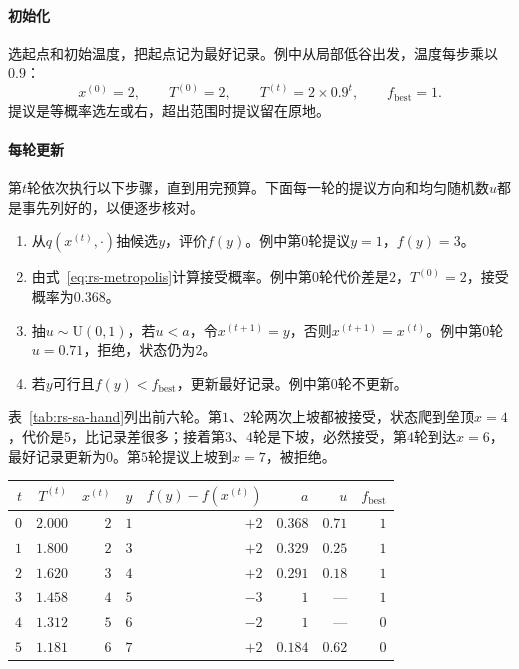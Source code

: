\paragraph{初始化}
选起点和初始温度，把起点记为最好记录。例中从局部低谷出发，温度每步乘以$0.9$：
\[
 x^{(0)}=2,\qquad T^{(0)}=2,\qquad T^{(t)}=2\times0.9^{t},\qquad f_{\mathrm{best}}=1.
\]
提议是等概率选左或右，超出范围时提议留在原地。

\paragraph{每轮更新}
第$t$轮依次执行以下步骤，直到用完预算。下面每一轮的提议方向和均匀随机数$u$都是事先列好的，以便逐步核对。

\begin{enumerate}
 \item 从$q(x^{(t)},\cdot)$抽候选$y$，评价$f(y)$。例中第$0$轮提议$y=1$，$f(y)=3$。
 \item 由式~\eqref{eq:rs-metropolis}计算接受概率。例中第$0$轮代价差是$2$，$T^{(0)}=2$，接受概率为$0.368$。
 \item 抽$u\sim\mathrm{U}(0,1)$，若$u<a$，令$x^{(t+1)}=y$，否则$x^{(t+1)}=x^{(t)}$。例中第$0$轮$u=0.71$，拒绝，状态仍为$2$。
 \item 若$y$可行且$f(y)<f_{\mathrm{best}}$，更新最好记录。例中第$0$轮不更新。
\end{enumerate}

表~\ref{tab:rs-sa-hand}列出前六轮。第$1$、$2$轮两次上坡都被接受，状态爬到垒顶$x=4$，代价是$5$，比记录差很多；接着第$3$、$4$轮是下坡，必然接受，第$4$轮到达$x=6$，最好记录更新为$0$。第$5$轮提议上坡到$x=7$，被拒绝。

\begin{BookInlineTable}
 \centering
 \caption{双谷代价上的前六轮，$a$是接受概率，$u$是列好的随机数。}
 \label{tab:rs-sa-hand}
 \begin{tabular}{rrrrrrrr}
  \toprule
  $t$ & $T^{(t)}$ & $x^{(t)}$ & $y$ & $f(y)-f(x^{(t)})$ & $a$ & $u$ & $f_{\mathrm{best}}$ \\
  \midrule
  $0$ & $2.000$ & $2$ & $1$ & $+2$ & $0.368$ & $0.71$ & $1$ \\
  $1$ & $1.800$ & $2$ & $3$ & $+2$ & $0.329$ & $0.25$ & $1$ \\
  $2$ & $1.620$ & $3$ & $4$ & $+2$ & $0.291$ & $0.18$ & $1$ \\
  $3$ & $1.458$ & $4$ & $5$ & $-3$ & $1$ & --- & $1$ \\
  $4$ & $1.312$ & $5$ & $6$ & $-2$ & $1$ & --- & $0$ \\
  $5$ & $1.181$ & $6$ & $7$ & $+2$ & $0.184$ & $0.62$ & $0$ \\
  \bottomrule
 \end{tabular}
\end{BookInlineTable}

